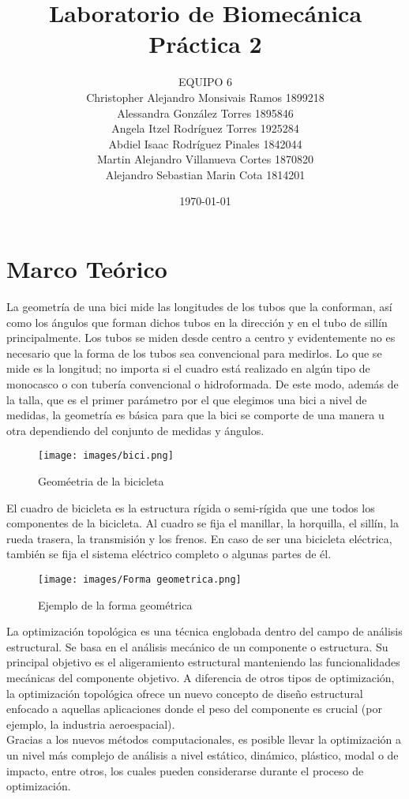 \documentclass{article}
\author{EQUIPO 6\\Christopher Alejandro Monsivais Ramos   1899218\\
Alessandra González Torres  1895846\\
Angela Itzel Rodríguez Torres   1925284\\
Abdiel Isaac Rodríguez Pinales  1842044\\
Martin Alejandro Villanueva Cortes  1870820\\
Alejandro Sebastian Marin Cota  1814201} %
\title{Laboratorio de Biomecánica\\Pr\'{a}ctica 2} %
\date{\today}
\begin{document}

\maketitle %



\section{Marco Te\'{o}rico}\label{intro} %

La geometría de una bici mide las longitudes de los tubos que la conforman, así como los ángulos que forman dichos tubos en la dirección y en el tubo de sillín principalmente. Los tubos se miden desde centro a centro y evidentemente no es necesario que la forma de los tubos sea convencional para medirlos. Lo que se mide es la longitud; no importa si el cuadro está realizado en algún tipo de monocasco o con tubería convencional o hidroformada. De este modo, además de la talla, que es el primer parámetro por el que elegimos una bici a nivel de medidas, la geometría es básica para que la bici se comporte de una manera u otra dependiendo del conjunto de medidas y ángulos.

\begin{figure}[h] %
    \centering
    \texttt{[image: images/bici.png]} %
    \caption{Geom\'{e}etria de la bicicleta}
\end{figure}


El cuadro de bicicleta es la estructura rígida o semi-rígida que une todos los componentes de la bicicleta. Al cuadro se fija el manillar, la horquilla, el sillín, la rueda trasera, la transmisión y los frenos. En caso de ser una bicicleta eléctrica, también se fija el sistema eléctrico completo o algunas partes de él.

\begin{figure}[h] %
    \centering
    \texttt{[image: images/Forma geometrica.png]} %
    \caption{Ejemplo de la forma geom\'{e}trica}
\end{figure}

\newpage

La optimización topológica es una técnica englobada dentro del campo de análisis estructural. Se basa en el análisis mecánico de un componente o estructura. Su principal objetivo es el aligeramiento estructural manteniendo las funcionalidades mecánicas del componente objetivo. A diferencia de otros tipos de optimización, la optimización topológica ofrece un nuevo concepto de diseño estructural enfocado a aquellas aplicaciones donde el peso del componente es crucial (por ejemplo, la industria aeroespacial).
\\
Gracias a los nuevos métodos computacionales, es posible llevar la optimización a un nivel más complejo de análisis a nivel estático, dinámico, plástico, modal o de impacto, entre otros, los cuales pueden considerarse durante el proceso de optimización.\cite{ff3}
\end{document}
